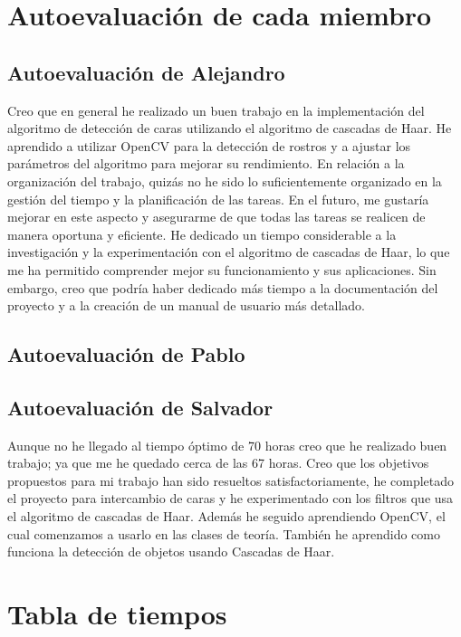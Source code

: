 \documentclass[a4paper]{article}
\begin{document}
\section{Autoevaluación de cada miembro}

\subsection{Autoevaluación de Alejandro}

Creo que en general he realizado un buen trabajo en la implementación del algoritmo de detección de caras utilizando el algoritmo de cascadas de Haar. He aprendido a utilizar OpenCV para la detección de rostros y a ajustar los parámetros del algoritmo para mejorar su rendimiento.
En relación a la organización del trabajo, quizás no he sido lo suficientemente organizado en la gestión del tiempo y la planificación de las tareas. En el futuro, me gustaría mejorar en este aspecto y asegurarme de que todas las tareas se realicen de manera oportuna y eficiente.
He dedicado un tiempo considerable a la investigación y la experimentación con el algoritmo de cascadas de Haar, lo que me ha permitido comprender mejor su funcionamiento y sus aplicaciones. Sin embargo, creo que podría haber dedicado más tiempo a la documentación del proyecto y a la creación de un manual de usuario más detallado.

\subsection{Autoevaluación de Pablo}

\subsection{Autoevaluación de Salvador}

Aunque no he llegado al tiempo óptimo de 70 horas creo que he realizado buen trabajo; ya que me he quedado cerca de las 67 horas.
Creo que los objetivos propuestos para mi trabajo han sido resueltos satisfactoriamente, he completado el proyecto para intercambio de caras y he experimentado con los filtros que usa el algoritmo de cascadas de Haar.
Además he seguido aprendiendo OpenCV, el cual comenzamos a usarlo en las clases de teoría.
También he aprendido como funciona la detección de objetos usando Cascadas de Haar.

\section{Tabla de tiempos}
\end{document}
